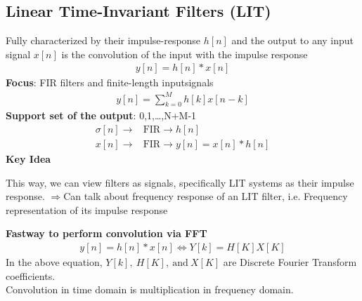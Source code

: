 \documentclass{article}
\newlength\tindent
\renewcommand{\indent}{\hspace*{\tindent}}
\begin{document}
    \subsection{Linear Time-Invariant Filters (LIT)}
        Fully characterized by their impulse-response $h[n]$ and the output to any input signal 
        $x[n]$ is the convolution of the input with the impulse response
        \begin{align}
            y[n] = h[n] * x[n]
        \end{align}
        \textbf{Focus}: FIR filters and finite-length inputsignals
        \begin{align}
            y[n] = \sum_{k = 0}^{M} {h[k]x[n-k]}
        \end{align}
        \textbf{Support set of the output}: 0,1,\dots,N+M-1
        \begin{align}
            \sigma[n] \rightarrow &\text{FIR} \rightarrow h[n] \nonumber\\
            x[n] \rightarrow &\text{FIR} \rightarrow y[n] = x[n] * h[n] \nonumber
        \end{align}
        \textbf{Key Idea}

        This way, we can view filters as signals, specifically LIT systems as their impulse response.
        $\Rightarrow$Can talk about frequency response of an LIT filter, 
        i.e. Frequency representation of its impulse response\\\indent

        \textbf{Fastway to perform convolution via FFT}
        \begin{align}
            y[n] = h[n]*x[n] \iff Y[k] = H[K] X[K]
        \end{align}
        In the above equation, $Y[k],~ H[K],~\text{and}~X[K]$ are Discrete Fourier Transform coefficients.\\\indent
        Convolution in time domain is multiplication in frequency domain.\\\indent
\end{document}
